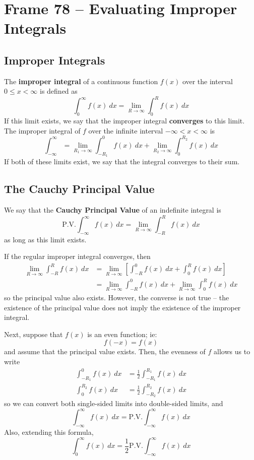 \documentclass{article}
\renewcommand{\emph}{\textbf}
\begin{document}
\section{Frame 78 -- Evaluating Improper Integrals}
\subsection{Improper Integrals}
The \emph{improper integral} of a continuous function $f(x)$ over the interval $0 \le x < \infty$ is defined as
\[
	\int_0^\infty f(x)~dx = \lim_{R \to \infty} \int_0^R f(x)~dx
\]
If this limit exists, we say that the improper integral \emph{converges} to this limit. The improper integral of $f$ over the infinite interval $-\infty < x < \infty$ is
\[
	\int_{-\infty}^\infty 
	= \lim_{R_1 \to \infty} \int_{-R_1}^0 f(x)~dx
	+ \lim_{R_2 \to \infty} \int_0^{R_2}  f(x)~dx
\]
If both of these limits exist, we say that the integral converges to their sum.

\subsection{The Cauchy Principal Value}
We say that the \emph{Cauchy Principal Value} of an indefinite integral is
\[
	\text{P.V.} \int_{-\infty}^\infty f(x)~dx
	= \lim_{R \to \infty} \int_{-R}^R f(x)~dx
\]
as long as this limit exists. 

If the regular improper integral converges, then
\begin{align*}
	\lim_{R \to \infty} \int_{-R}^R f(x)~dx 
	&= \lim_{R \to \infty} \left[ \int_{-R}^0 f(x)~dx + \int_0^R f(x)~dx \right] \\
	&= \lim_{R \to \infty} \int_{-R}^0 f(x)~dx + \lim_{R \to \infty} \int_0^R f(x)~dx
\end{align*}
so the principal value also exists. However, the converse is not true -- the existence of the principal value does not imply the existence of the improper integral.

Next, suppose that $f(x)$ is an even function; ie:
\[
	f(-x) = f(x)
\]
and assume that the principal value exists. Then, the evenness of $f$ allows us to write
\begin{align*}
	\int_{-R_1}^0 f(x)~dx &= \frac{1}{2} \int_{-R_1}^{R_1} f(x)~dx \\
	\int_0^{R_2}  f(x)~dx &= \frac{1}{2} \int_{-R_2}^{R_2} f(x)~dx
\end{align*}
so we can convert both single-sided limits into double-sided limits, and
\[
	\int_{-\infty}^\infty f(x)~dx = \text{P.V.} \int_{-\infty}^\infty f(x)~dx
\]
Also, extending this formula,
\[
	\int_0^\infty f(x)~dx = \frac{1}{2} \text{P.V.} \int_{-\infty}^\infty f(x)~dx
\]
\end{document}

